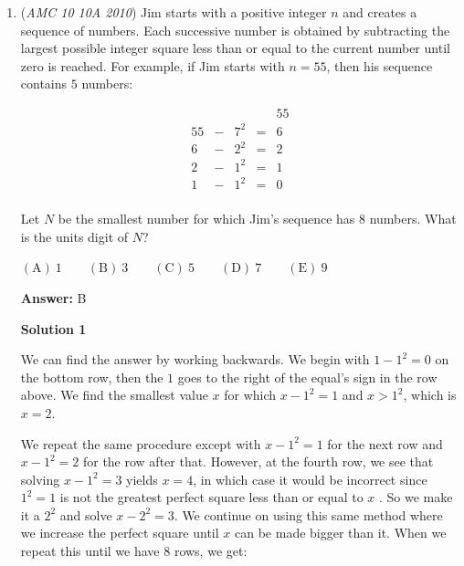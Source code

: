 \begin{enumerate}
In this problem, $n \equiv 12 (\bmod { \quad 25})$, $n \equiv 0 (\bmod { \quad 4})$:

 \begin{verbatim}
$n \equiv 12 (\bmod{ \quad 25})$, $n \equiv 0 (\bmod{ \quad 4})$, $(25, 4) = 1$$1 \cdot 25 \equiv 1 (\bmod{ \quad 4})$, $19 \cdot 4 \equiv 1 (\bmod{ \quad 25})$Then $n \equiv 19 \cdot 4 \cdot 12 + 1 \cdot 25 \cdot 0 \equiv 12 (\bmod{ \quad 100})$
\end{verbatim}




	\item (\textit{AMC 10 10A 2010}) Jim starts with a positive integer $n$ and creates a sequence of numbers. Each successive number is obtained by subtracting the largest possible integer square less than or equal to the current number until zero is reached. For example, if Jim starts with $n = 55$, then his sequence contains $5$ numbers:


 


 \[\begin{array}{ccccc} {}&{}&{}&{}&55\\ 55&-&7^2&=&6\\ 6&-&2^2&=&2\\ 2&-&1^2&=&1\\ 1&-&1^2&=&0\\ \end{array}\]


 Let $N$ be the smallest number for which Jim’s sequence has $8$ numbers. What is the units digit of $N$?


 $\mathrm{(A)}\ 1 \qquad \mathrm{(B)}\ 3 \qquad \mathrm{(C)}\ 5 \qquad \mathrm{(D)}\ 7 \qquad \mathrm{(E)}\ 9$

 \textbf{Answer: }B



\textbf{Solution 1}

We can find the answer by working backwards. We begin with $1-1^2=0$ on the bottom row, then the $1$ goes to the right of the equal's sign in the row above. We find the smallest value $x$ for which $x-1^2=1$ and $x>1^2$, which is $x=2$.

 We repeat the same procedure except with $x-1^2=1$ for the next row and $x-1^2=2$ for the row after that. However, at the fourth row, we see that solving $x-1^2=3$ yields $x=4$, in which case it would be incorrect since $1^2=1$ is not the greatest perfect square less than or equal to $x$ . So we make it a $2^2$ and solve $x-2^2=3$. We continue on using this same method where we increase the perfect square until $x$ can be made bigger than it. When we repeat this until we have $8$ rows, we get:


\end{enumerate}
